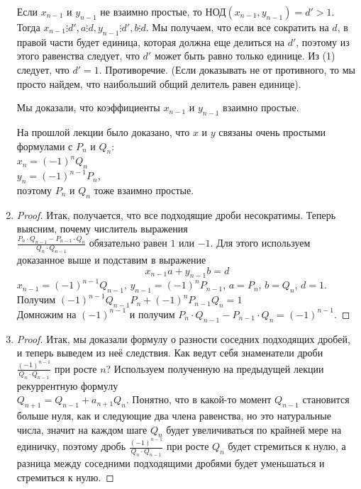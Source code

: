 \documentclass[russian]{lecture-notes}
\begin{document}
\begin{enumerate}
		Если $x_{n-1}$ и $y_{n-1}$ не взаимно простые, то НОД$(x_{n-1}, y_{n-1}) = d' > 1$. Тогда $x_{n-1} \vdots d', a \vdots d, y_{n-1} \vdots d', b \vdots d$. Мы получаем, что если все сократить на $d$, в правой части будет единица, которая должна еще делиться на $d'$, поэтому из этого равенства следует, что $d'$ может быть равно только единице. Из (1) следует, что $d' = 1$. Противоречие. (Если доказывать не от противного, то мы просто найдем, что наибольший общий делитель равен единице).
		
		Мы доказали, что коэффициенты $x_{n-1}$ и $y_{n-1}$ взаимно простые.
		
		\begin{remark}
			На прошлой лекции было доказано, что $x$ и $y$ связаны очень простыми формулами с $P_n$ и $Q_n$: \\
			$x_n = (-1)^nQ_n$\\
			$y_n = (-1)^{n-1}P_n$,\\
			поэтому $P_n$ и $Q_n$ тоже взаимно простые. 
		\end{remark}
	
		\item \begin{proof}
		
			Итак, получается, что все подходящие дроби несократимы. Теперь выясним, почему числитель выражения\\ $\frac{P_n\cdot Q_{n-1}-P_{n-1}\cdot Q_n}{Q_n\cdot Q_{n-1}}$ обязательно равен $1$ или $-1$. Для этого используем доказанное выше  и подставим в выражение
		\begin{equation}
			x_{n-1}a + y_{n-1}b = d
		\end{equation}
			 $x_{n-1} = (-1)^{n-1}Q_{n-1}$, $y_{n-1} = (-1)^nP_{n-1}$, $a=P_n$, $b=Q_n$, $d = 1$.\\
			Получим $(-1)^{n-1}Q_{n-1}P_n + (-1)^nP_{n-1}Q_n = 1$ \\
			Домножим на $(-1)^{n-1}$ и получим $P_n\cdot Q_{n-1}-P_{n-1}\cdot Q_n = (-1)^{n-1}$.
		\end{proof}
		
		\item \begin{proof}
			Итак, мы доказали формулу о разности соседних подходящих дробей, и теперь выведем из неё следствия. Как ведут себя знаменатели дроби $\frac{(-1)^{n-1}}{Q_n\cdot Q_{n-1}}$ при росте $n$? Используем полученную на предыдущей лекции рекуррентную формулу\\ $Q_{n+1} = Q_{n-1} + a_{n+1}Q_n$. Понятно, что в какой-то момент $Q_{n-1}$ становится больше нуля, как и следующие два члена равенства, но это натуральные числа, значит на каждом шаге $Q_n$  будет увеличиваться по крайней мере на единичку, поэтому дробь $\frac{(-1)^{n-1}}{Q_n\cdot Q_{n-1}}$ при росте $Q_n$ будет стремиться к нулю, а разница между соседними подходящими дробями будет уменьшаться и стремиться к нулю. 
					

\end{proof}
\end{enumerate}
\end{document}
